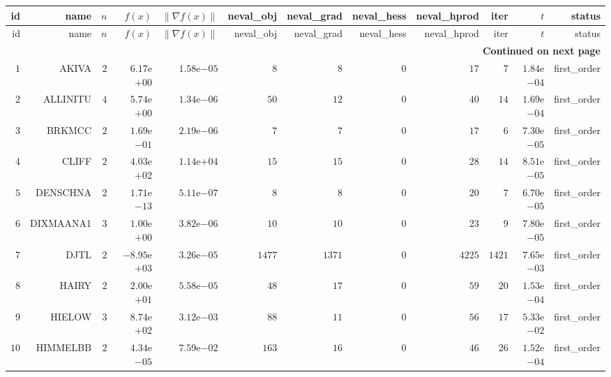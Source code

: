 \begin{longtable}{rrrrrrrrrrrr}
  \hline
  id & name & \(n\) & \(f(x)\) & \(\|\nabla f(x)\|\) & neval\_obj & neval\_grad & neval\_hess & neval\_hprod & iter & \(t\) & status \\\hline
  \endfirsthead
  \hline
  id & name & \(n\) & \(f(x)\) & \(\|\nabla f(x)\|\) & neval\_obj & neval\_grad & neval\_hess & neval\_hprod & iter & \(t\) & status \\\hline
  \endhead
  \hline
  \multicolumn{12}{r}{{\bfseries Continued on next page}}\\
  \hline
  \endfoot
  \endlastfoot
  \(     1\) & AKIVA & \(     2\) & \( 6.17\)e\(+00\) & \( 1.58\)e\(-05\) & \(     8\) & \(     8\) & \(     0\) & \(    17\) & \(     7\) & \( 1.84\)e\(-04\) & first\_order \\
  \(     2\) & ALLINITU & \(     4\) & \( 5.74\)e\(+00\) & \( 1.34\)e\(-06\) & \(    50\) & \(    12\) & \(     0\) & \(    40\) & \(    14\) & \( 1.69\)e\(-04\) & first\_order \\
  \(     3\) & BRKMCC & \(     2\) & \( 1.69\)e\(-01\) & \( 2.19\)e\(-06\) & \(     7\) & \(     7\) & \(     0\) & \(    17\) & \(     6\) & \( 7.30\)e\(-05\) & first\_order \\
  \(     4\) & CLIFF & \(     2\) & \( 4.03\)e\(+02\) & \( 1.14\)e\(+04\) & \(    15\) & \(    15\) & \(     0\) & \(    28\) & \(    14\) & \( 8.51\)e\(-05\) & first\_order \\
  \(     5\) & DENSCHNA & \(     2\) & \( 1.71\)e\(-13\) & \( 5.11\)e\(-07\) & \(     8\) & \(     8\) & \(     0\) & \(    20\) & \(     7\) & \( 6.70\)e\(-05\) & first\_order \\
  \(     6\) & DIXMAANA1 & \(     3\) & \( 1.00\)e\(+00\) & \( 3.82\)e\(-06\) & \(    10\) & \(    10\) & \(     0\) & \(    23\) & \(     9\) & \( 7.80\)e\(-05\) & first\_order \\
  \(     7\) & DJTL & \(     2\) & \(-8.95\)e\(+03\) & \( 3.26\)e\(-05\) & \(  1477\) & \(  1371\) & \(     0\) & \(  4225\) & \(  1421\) & \( 7.65\)e\(-03\) & first\_order \\
  \(     8\) & HAIRY & \(     2\) & \( 2.00\)e\(+01\) & \( 5.58\)e\(-05\) & \(    48\) & \(    17\) & \(     0\) & \(    59\) & \(    20\) & \( 1.53\)e\(-04\) & first\_order \\
  \(     9\) & HIELOW & \(     3\) & \( 8.74\)e\(+02\) & \( 3.12\)e\(-03\) & \(    88\) & \(    11\) & \(     0\) & \(    56\) & \(    17\) & \( 5.33\)e\(-02\) & first\_order \\
  \(    10\) & HIMMELBB & \(     2\) & \( 4.34\)e\(-05\) & \( 7.59\)e\(-02\) & \(   163\) & \(    16\) & \(     0\) & \(    46\) & \(    26\) & \( 1.52\)e\(-04\) & first\_order \\

\end{longtable}
